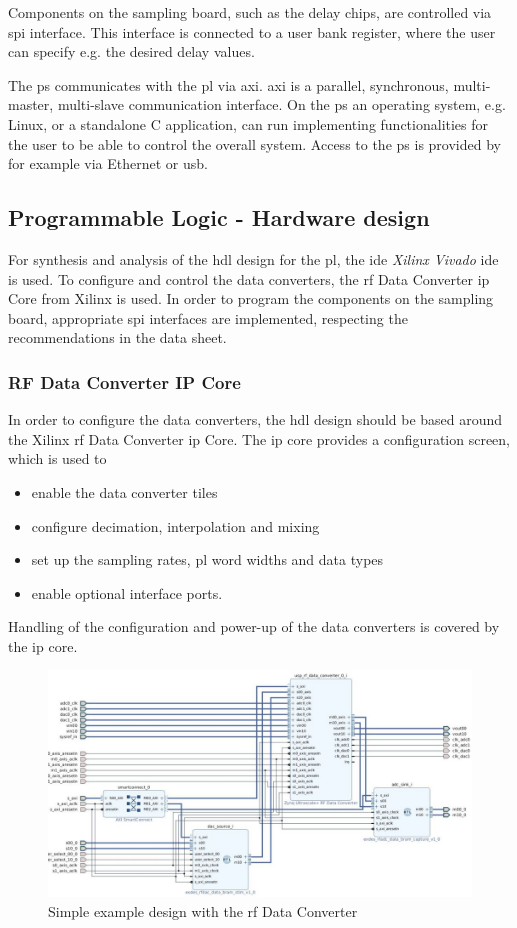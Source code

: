 Components on the sampling board, such as the delay chips, are controlled via \gls{spi} interface. 
This interface is connected to a user bank register, where the user can specify e.g. the desired delay values.

The \gls{ps} communicates with the \gls{pl} via \gls{axi}.
\gls{axi} is a parallel, synchronous, multi-master, multi-slave communication interface.
On the \gls{ps} an operating system, e.g. Linux, or a standalone C application, can run implementing functionalities for the user to be able to control the overall system.
Access to the \gls{ps} is provided by for example via Ethernet or \gls{usb}.


\subsection{Programmable Logic - Hardware design}
For synthesis and analysis of the \gls{hdl} design for the \gls{pl}, the \gls{ide} \textit{Xilinx Vivado} \gls{ide} is used.
To configure and control the data converters, the \gls{rf} Data Converter \gls{ip} Core from Xilinx is used.
In order to program the components on the sampling board, appropriate \gls{spi} interfaces are implemented, respecting the recommendations in the data sheet.

\subsubsection*{RF Data Converter IP Core}
In order to configure the data converters, the \gls{hdl} design should be based around the Xilinx \gls{rf} Data Converter \gls{ip} Core. 
The \gls{ip} core provides a configuration screen, which is used to 
\begin{itemize}
	\item enable the data converter tiles
	\item configure decimation, interpolation and mixing 
	\item set up the sampling rates, \gls{pl} word widths and data types
	\item enable optional interface ports.
\end{itemize}
Handling of the configuration and power-up of the data converters is covered by the \gls{ip} core. 

\begin{figure}[tb]
	\centering
	\includegraphics[width = \textwidth]{chap/05-readout/img/rf_data_converter}
	\caption{Simple example design with the \gls{rf} Data Converter}
	\label{fig:rf_dc_ex}
\end{figure}

